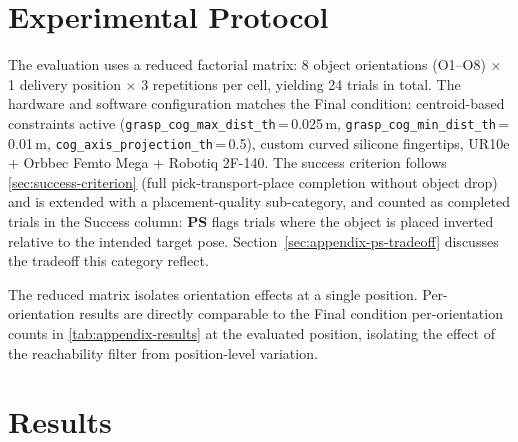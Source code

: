\documentclass[12pt, a4paper]{report}
\newcommand{\param}[1]{\texttt{#1}}
\begin{document}

\section{Experimental Protocol}
\label{sec:appendix-protocol}

The evaluation uses a reduced factorial matrix: 8 object orientations (O1--O8) $\times$ 1 delivery position $\times$ 3 repetitions per cell, yielding 24 trials in total. The hardware and software configuration matches the Final condition: centroid-based constraints active (\param{grasp\_cog\_max\_dist\_th}\,=\,0.025\,m, \param{grasp\_cog\_min\_dist\_th}\,=\,0.01\,m, \param{cog\_axis\_projection\_th}\,=\,0.5), custom curved silicone fingertips, UR10e + Orbbec Femto Mega + Robotiq 2F-140. The success criterion follows \cref{sec:success-criterion} (full pick-transport-place completion without object drop) and is extended with a placement-quality sub-category, and counted as completed trials in the Success column: \textbf{PS} flags trials where the object is placed inverted relative to the intended target pose. Section~\ref{sec:appendix-ps-tradeoff} discusses the tradeoff this category reflect.

The reduced matrix isolates orientation effects at a single position. Per-orientation results are directly comparable to the Final condition per-orientation counts in \cref{tab:appendix-results} at the evaluated position, isolating the effect of the reachability filter from position-level variation.

\section{Results}
\label{sec:appendix-results}
\end{document}
